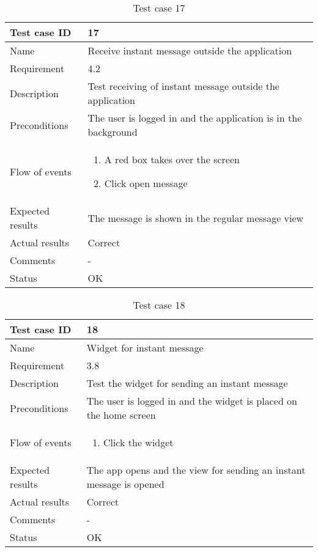 		\begin{table}
			\begin{tabular}{l|p{10cm}}
				Test case ID & 17 \\ \hline
				Name & Receive instant message outside the application\\ \hline
				Requirement & 4.2\\ \hline
				Description & Test receiving of instant message outside the application\\ \hline
				Preconditions & The user is logged in and the application is in the background\\ \hline
				Flow of events & 
					\begin{enumerate}
						\item{}A red box takes over the screen
						\item{}Click open message
					\end{enumerate} \\ \hline
				Expected results & The message is shown in the regular message view\\ \hline
				Actual results &Correct\\ \hline
				Comments &-\\ \hline
				Status & OK\\ \hline
			\end{tabular}
			\caption{Test case 17} \label{tab:case17}
		\end{table}

		\begin{table}
			\begin{tabular}{l|p{10cm}}
				Test case ID & 18 \\ \hline
				Name & Widget for instant message\\ \hline
				Requirement & 3.8\\ \hline
				Description & Test the widget for sending an instant message\\ \hline
				Preconditions & The user is logged in and the widget is placed on the home screen\\ \hline
				Flow of events & 
					\begin{enumerate}
						\item{}Click the widget
					\end{enumerate} \\ \hline
				Expected results & The app opens and the view for sending an instant message is opened\\ \hline
				Actual results & Correct\\ \hline
				Comments &-\\ \hline
				Status &OK \\ \hline
			\end{tabular}
			\caption{Test case 18} \label{tab:case18}
		\end{table}

